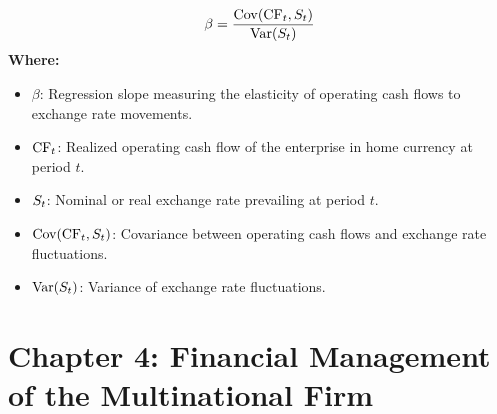 \begin{formulabox}
\begin{equation*}
    \beta = \frac{\operatorname{Cov}(\operatorname{CF}_t, S_t)}{\operatorname{Var}(S_t)}
\end{equation*}
\textbf{Where:}
\begin{itemize}[leftmargin=*, noitemsep]
    \item $\beta$: Regression slope measuring the elasticity of operating cash flows to exchange rate movements.
    \item $\operatorname{CF}_t$: Realized operating cash flow of the enterprise in home currency at period $t$.
    \item $S_t$: Nominal or real exchange rate prevailing at period $t$.
    \item $\operatorname{Cov}(\operatorname{CF}_t, S_t)$: Covariance between operating cash flows and exchange rate fluctuations.
    \item $\operatorname{Var}(S_t)$: Variance of exchange rate fluctuations.
\end{itemize}
\end{formulabox}

\section*{Chapter 4: Financial Management of the Multinational Firm}

